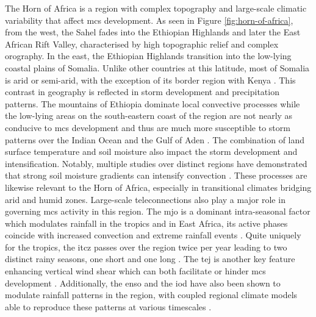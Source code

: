 The Horn of Africa is a region with complex topography and large-scale climatic variability that affect \acrshort{mcs} development. As seen in Figure \ref{fig:horn-of-africa}, from the west, the Sahel fades into the Ethiopian Highlands and later the East African Rift Valley, characterised by high topographic relief and complex orography. In the east, the Ethiopian Highlands transition into the low-lying coastal plains of Somalia. Unlike other countries at this latitude, most of Somalia is arid or semi-arid, with the exception of its border region with Kenya \citep{Beck2023}. This contrast in geography is reflected in storm development and precipitation patterns. The mountains of Ethiopia dominate local convective processes \citep{Negash2024} while the low-lying areas on the south-eastern coast of the region are not nearly as conducive to \acrshort{mcs} development and thus are much more susceptible to storm patterns over the Indian Ocean and the Gulf of Aden \citep{Camberlin2024}. The combination of land surface temperature and soil moisture also impact the storm development and intensification. Notably, multiple studies over distinct regions have demonstrated that strong soil moisture gradients can intensify convection \citep{Barton2021,Klein2020,Taylor2017}. These processes are likewise relevant to the Horn of Africa, especially in transitional climates bridging arid and humid zones. Large-scale \glspl{teleconnection} also play a major role in governing \acrshort{mcs} activity in this region. The \acrfull{mjo} is a dominant intra-seasonal factor which modulates rainfall in the tropics and in East Africa, its active phases coincide with increased convection and extreme rainfall events \citep{Camberlin2019,Ochieng2023,Pohl2006}. Quite uniquely for the tropics, the \acrfull{itcz} passes over the region twice per year leading to two distinct rainy seasons, one short and one long \citep{Palmer2023,Tefera2025}. The \acrfull{tej} is another key feature enhancing vertical wind shear which can both facilitate or hinder \acrshort{mcs} development \citep{Farnsworth2011,Vashisht2021}. Additionally, the \acrfull{enso} and the \acrfull{iod} have also been shown to modulate rainfall patterns in the region, with coupled regional climate models able to reproduce these patterns at various timescales \citep{Dubache2019,Endris2019,Vashisht2021,Zaroug2014}. 

